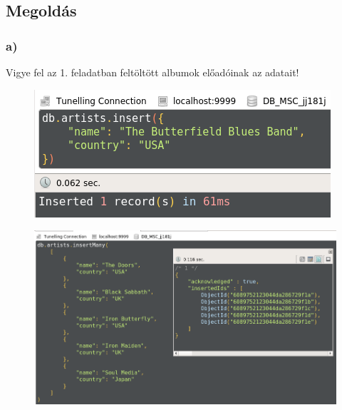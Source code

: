 \documentclass[a4paper, 12pt]{article}
\begin{document}
\subsection*{Megoldás}

\subsubsection*{a)}
Vigye fel az 1. feladatban feltöltött albumok előadóinak az adatait!
\begin{figure}[!hb]
	\centering
	\includegraphics[scale = 0.65]{images/2_a1.png}
	\label{fig:2_a1}
\end{figure}
\begin{figure}[!hb]
	\centering
	\includegraphics[scale = 0.5]{images/2_a2.png}
	\label{fig:2_a2}
\end{figure}
\clearpage
\end{document}
